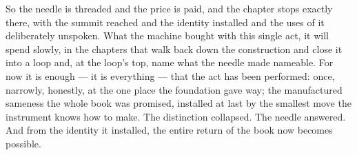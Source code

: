 So the needle is threaded and the price is paid, and the chapter stops exactly there, with the summit reached and
the identity installed and the uses of it deliberately unspoken. What the machine bought with this single act, it
will spend slowly, in the chapters that walk back down the construction and close it into a loop and, at the loop's
top, name what the needle made nameable. For now it is enough --- it is everything --- that the act has been
performed: once, narrowly, honestly, at the one place the foundation gave way; the manufactured sameness the whole
book was promised, installed at last by the smallest move the instrument knows how to make. The distinction
collapsed. The needle answered. And from the identity it installed, the entire return of the book now becomes
possible.
